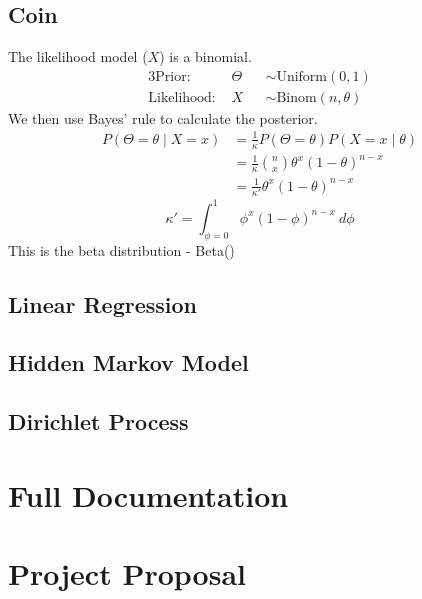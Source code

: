 \documentclass[12pt,notitlepage,a4paper]{report}
\begin{document}
\section{Coin} \label{app:coin}
The likelihood model ($X$) is a binomial.
% 
\begin{alignat*}{3}
	\text{Prior:~}      & \Theta &   & \sim \text{Uniform}(0,1)    \\
	\text{Likelihood:~} & X      &   & \sim \text{Binom}(n,\theta) 
\end{alignat*}
% 
We then use Bayes' rule to calculate the posterior.
\begin{align*}
	P(\Theta=\theta \mid X=x) & = \frac{1}{\kappa}P(\Theta=\theta)P(X=x\mid\theta)     \\ 
	                          & = \frac{1}{\kappa}\binom{n}{x}\theta^x(1-\theta)^{n-x} \\
	                          & = \frac{1}{\kappa'}\theta^x(1-\theta)^{n-x}            
\end{align*}
$$\kappa'=\int_{\phi=0}^1\phi^x(1-\phi)^{n-x}~d\phi$$
This is the beta distribution - Beta()
\section{Linear Regression} \label{app:linreg}
\section{Hidden Markov Model} \label{app:hmm}
\section{Dirichlet Process} \label{app:dp}

\chapter{Full Documentation} \label{app:docs}

\chapter{Project Proposal}

\end{document}
